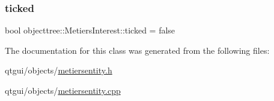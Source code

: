 \subsubsection{\texorpdfstring{ticked}{ticked}}
{\footnotesize\ttfamily bool objecttree\+::\+Metiers\+Interest\+::ticked = false}



The documentation for this class was generated from the following files\+:\begin{DoxyCompactItemize}
\item 
qtgui/objects/\mbox{\hyperlink{metiersentity_8h}{metiersentity.\+h}}\item 
qtgui/objects/\mbox{\hyperlink{metiersentity_8cpp}{metiersentity.\+cpp}}\end{DoxyCompactItemize}
